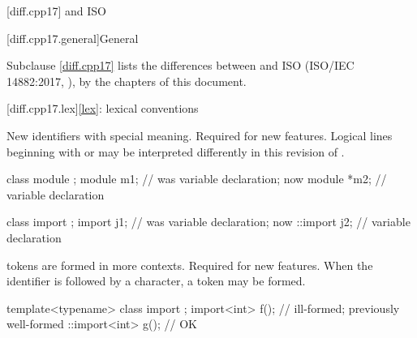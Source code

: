 [diff.cpp17]{\Cpp{} and ISO \CppXVII{}}

[diff.cpp17.general]{General}

\pnum
{}%
Subclause \ref{diff.cpp17} lists the differences between \Cpp{} and
ISO \CppXVII{} (ISO/IEC 14882:2017, ),
by the chapters of this document.

[diff.cpp17.lex]{\ref{lex}: lexical conventions}

\change
New identifiers with special meaning.
\rationale
Required for new features.
\effect
Logical lines beginning with
 or  may
be interpreted differently
in this revision of \Cpp{}.
\begin{example}
\begin{codeblock}
class module {};
module m1;          // was variable declaration; now 
module *m2;         // variable declaration

class import {};
import j1;          // was variable declaration; now 
::import j2;        // variable declaration
\end{codeblock}
\end{example}

\change
{} tokens are formed in more contexts.
\rationale
Required for new features.
\effect
When the identifier 
is followed by a \tcode{<} character,
a  token may be formed.
\begin{example}
\begin{codeblock}
template<typename> class import {};
import<int> f();                // ill-formed; previously well-formed
::import<int> g();              // OK
\end{codeblock}
\end{example}

